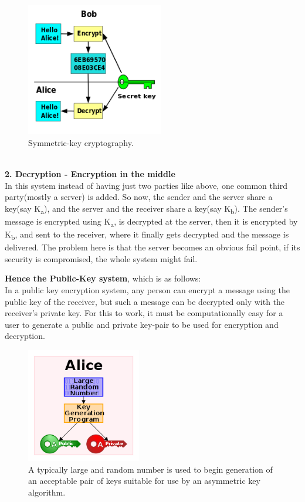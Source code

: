 \documentclass[12 pt]{article}
\begin{document}
\begin{figure}[h!]
  \includegraphics[width=60mm]{Symmetric_key_encryption.png}
  \centering
  \caption{Symmetric-key cryptography.}
  \label{fig:Symmetric-key cryptography}
\end{figure}
\noindent
\\\textbf{2. Decryption - Encryption in the middle}
\\In this system instead of having just two parties like above, one common third party(mostly a server) is added. So now, the sender and the server share a key(say K\textsubscript{a}), and the server and the receiver share a key(say K\textsubscript{b}). The sender's message is encrypted using K\textsubscript{a}, is decrypted at the server, then it is encrypted by K\textsubscript{b}, and sent to the receiver, where it finally gets decrypted and the message is delivered. The problem here is that the server becomes an obvious fail point, if its security is compromised, the whole system might fail.

\textbf{Hence the Public-Key system}, which is as follows:
\\
\noindent In a public key encryption system, any person can encrypt a message using the public key of the receiver, but such a message can be decrypted only with the receiver's private key. For this to work, it must be computationally easy for a user to generate a public and private key-pair to be used for encryption and decryption.

\begin{figure}[h!]
  \includegraphics[width=50mm]{250px-Public-key-crypto-1.png}
  \centering
  \caption{A typically large and random number is used to begin generation of an acceptable pair of keys suitable for use by an asymmetric key algorithm.}
  \label{fig:PublicKey-NumGen}
\end{figure}
\end{document}
